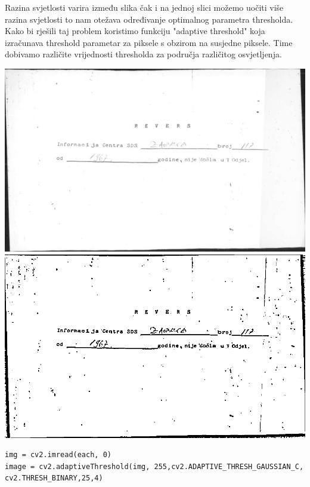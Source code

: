\documentclass{article}
\begin{document}
Razina svjetlosti varira između slika čak i na jednoj slici možemo uočiti više razina svjetlosti to nam otežava određivanje optimalnog parametra thresholda. \\ Kako bi rješili taj problem koristimo funkciju "adaptive threshold" koja izračunava threshold parametar za piksele s obzirom na susjedne piksele. Time dobivamo različite vrijednosti thresholda za područja različitog osvjetljenja.
\newline
\begin{center}
    \includegraphics[scale=0.2]{Z05353721-cont.jpg}
    \includegraphics[scale=0.2]{Z05353721_adatpive.jpg}
\end{center}

\newline
\begin{lstlisting}
img = cv2.imread(each, 0)
image = cv2.adaptiveThreshold(img, 255,cv2.ADAPTIVE_THRESH_GAUSSIAN_C, cv2.THRESH_BINARY,25,4)
\end{lstlisting}
\end{document}
